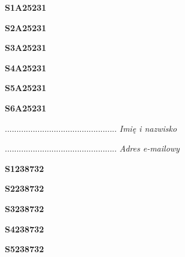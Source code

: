 \begin{turn}{90}\huge \textbf{S1A25231}\end{turn}

\begin{turn}{90}\huge \textbf{S2A25231}\end{turn}

\begin{turn}{90}\huge \textbf{S3A25231}\end{turn}

\begin{turn}{90}\huge \textbf{S4A25231}\end{turn}

\begin{turn}{90}\huge \textbf{S5A25231}\end{turn}

\begin{turn}{90}\huge \textbf{S6A25231}\end{turn}

\begin{turn}{90}\begin{minipage}{\linewidth} \vspace{20mm} ................................................  \textit{Imię i nazwisko}\end{minipage}\end{turn}

\begin{turn}{90}\begin{minipage}{\linewidth} \vspace{20mm} ................................................  \textit{Adres e-mailowy}\end{minipage}\end{turn}

\begin{turn}{90}\huge \textbf{S1238732}\end{turn}

\begin{turn}{90}\huge \textbf{S2238732}\end{turn}

\begin{turn}{90}\huge \textbf{S3238732}\end{turn}

\begin{turn}{90}\huge \textbf{S4238732}\end{turn}

\begin{turn}{90}\huge \textbf{S5238732}\end{turn}

